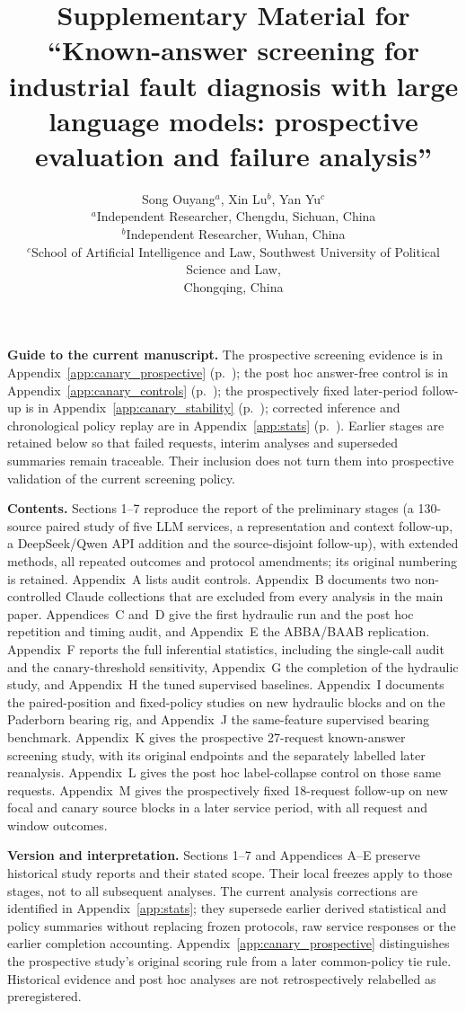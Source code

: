 \documentclass[11pt,a4paper]{article}
\title{Supplementary Material for ``Known-answer screening for industrial fault diagnosis with large language models: prospective evaluation and failure analysis''}
\author{Song Ouyang$^{a}$, Xin Lu$^{b}$, Yan Yu$^{c}$\\[2pt]
\small $^{a}$Independent Researcher, Chengdu, Sichuan, China\\
\small $^{b}$Independent Researcher, Wuhan, China\\
\small $^{c}$School of Artificial Intelligence and Law, Southwest University of Political Science and Law,\\ \small Chongqing, China}
\date{}
\begin{document}
\maketitle
\noindent\textbf{Guide to the current manuscript.} The prospective screening evidence is in Appendix~\ref{app:canary_prospective} (p.~\pageref{app:canary_prospective}); the post hoc answer-free control is in Appendix~\ref{app:canary_controls} (p.~\pageref{app:canary_controls}); the prospectively fixed later-period follow-up is in Appendix~\ref{app:canary_stability} (p.~\pageref{app:canary_stability}); corrected inference and chronological policy replay are in Appendix~\ref{app:stats} (p.~\pageref{app:stats}). Earlier stages are retained below so that failed requests, interim analyses and superseded summaries remain traceable. Their inclusion does not turn them into prospective validation of the current screening policy.

\medskip
\noindent\textbf{Contents.} Sections 1--7 reproduce the report of the preliminary stages (a 130-source paired study of five LLM services, a representation and context follow-up, a DeepSeek/Qwen API addition and the source-disjoint follow-up), with extended methods, all repeated outcomes and protocol amendments; its original numbering is retained. Appendix~A lists audit controls. Appendix~B documents two non-controlled Claude collections that are excluded from every analysis in the main paper. Appendices~C and~D give the first hydraulic run and the post hoc repetition and timing audit, and Appendix~E the ABBA/BAAB replication. Appendix~F reports the full inferential statistics, including the single-call audit and the canary-threshold sensitivity, Appendix~G the completion of the hydraulic study, and Appendix~H the tuned supervised baselines. Appendix~I documents the paired-position and fixed-policy studies on new hydraulic blocks and on the Paderborn bearing rig, and Appendix~J the same-feature supervised bearing benchmark. Appendix~K gives the prospective 27-request known-answer screening study, with its original endpoints and the separately labelled later reanalysis. Appendix~L gives the post hoc label-collapse control on those same requests. Appendix~M gives the prospectively fixed 18-request follow-up on new focal and canary source blocks in a later service period, with all request and window outcomes.

\medskip
\noindent\textbf{Version and interpretation.} Sections 1--7 and Appendices A--E preserve historical study reports and their stated scope. Their local freezes apply to those stages, not to all subsequent analyses. The current analysis corrections are identified in Appendix~\ref{app:stats}; they supersede earlier derived statistical and policy summaries without replacing frozen protocols, raw service responses or the earlier completion accounting. Appendix~\ref{app:canary_prospective} distinguishes the prospective study's original scoring rule from a later common-policy tie rule. Historical evidence and post hoc analyses are not retrospectively relabelled as preregistered.
\end{document}
